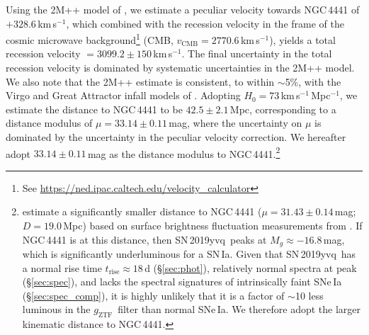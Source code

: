 \documentclass[twocolumn]{aastex63}
\newcommand{\fromkate}[1]{{\color{brown} fromKM: {#1}}}
\newcommand{\todo}[1]{{\color{magenta} to-do: {#1}}}
\newcommand{\gztf}{$g_\mathrm{ZTF}$}
\newcommand{\kms}{km\,s$^{-1}$}
\newcommand{\sn}{SN\,2019yvq}
\begin{document}
Using the 2M++ model of \citet{Carrick15}, we estimate a peculiar velocity
towards NGC\,4441 of $+328.6$\,\kms, which combined with the recession
velocity in the frame of the cosmic microwave background\footnote{See
\url{https://ned.ipac.caltech.edu/velocity_calculator}} (CMB, $v_\mathrm{CMB}
= 2770.6$\,\kms), yields a total recession velocity $= 3099.2 \pm 150$\,\kms.
The final uncertainty in the total recession velocity is dominated by
systematic uncertainties in the 2M++ model. We also note that the 2M++
estimate is consistent, to within $\sim$5\%, with the Virgo and Great
Attractor infall models of \citet{Mould00}. Adopting $H_0 =
73$\,\kms\,Mpc$^{-1}$, we estimate the distance to NGC\,4441 to be $42.5 \pm
2.1$\,Mpc, corresponding to a distance modulus of $\mu = 33.14 \pm 0.11$\,mag,
where the uncertainty on $\mu$ is dominated by the uncertainty in the peculiar
velocity correction. We hereafter adopt $33.14 \pm 0.11$\,mag as the distance
modulus to NGC\,4441.\footnote{\citet{Tully13} estimate a significantly
smaller distance to NGC\,4441 ($\mu = 31.43 \pm 0.14$\,mag; $D = 19.0$\,Mpc)
based on surface brightness fluctuation measurements from \citet{Tonry01}. If
NGC\,4441 is at this distance, then \sn\ peaks at $M_g \approx -16.8$\,mag,
which is significantly underluminous for a SN\,Ia. Given that \sn\ has a
normal rise time $t_\mathrm{rise} \approx 18$\,d (\S\ref{sec:phot}),
relatively normal spectra at peak (\S\ref{sec:spec}), and lacks the spectral
signatures of intrinsically faint SNe\,Ia (\S\ref{sec:spec_comp}), it is
highly unlikely that it is a factor of $\sim$10 less luminous in the \gztf\
filter than normal SNe\,Ia. We therefore adopt the larger kinematic distance
to NGC\,4441.}
\end{document}
